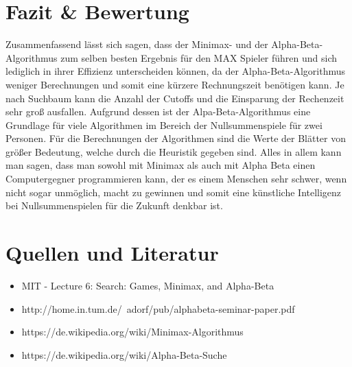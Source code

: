 \section{Fazit \& Bewertung}

Zusammenfassend lässt sich sagen, dass der Minimax- und der Alpha-Beta-Algorithmus zum selben besten Ergebnis für den MAX Spieler führen und sich lediglich in ihrer Effizienz unterscheiden können, da der Alpha-Beta-Algorithmus weniger Berechnungen und somit eine kürzere Rechnungszeit benötigen kann. Je nach Suchbaum kann die Anzahl der Cutoffs und die Einsparung der Rechenzeit sehr groß ausfallen. Aufgrund dessen ist der Alpa-Beta-Algorithmus eine Grundlage für viele Algorithmen im Bereich der Nullsummenspiele für zwei Personen. Für die Berechnungen der Algorithmen sind die Werte der Blätter von größer Bedeutung, welche durch die Heuristik gegeben sind. Alles in allem kann man sagen, dass man sowohl mit Minimax als auch mit Alpha Beta einen Computergegner programmieren kann, der es einem Menschen sehr schwer, wenn nicht sogar unmöglich, macht zu gewinnen und somit eine künstliche Intelligenz bei Nullsummenspielen für die Zukunft denkbar ist.


\section{Quellen und Literatur}

\begin{itemize}
\item MIT - Lecture 6: Search: Games, Minimax, and Alpha-Beta
\item http://home.in.tum.de/~adorf/pub/alphabeta-seminar-paper.pdf
\item https://de.wikipedia.org/wiki/Minimax-Algorithmus
\item https://de.wikipedia.org/wiki/Alpha-Beta-Suche
\end{itemize}
